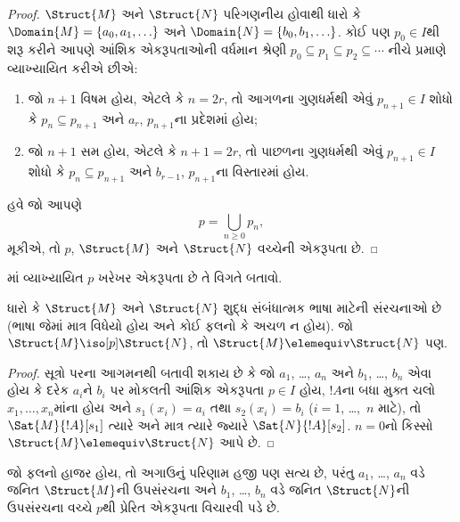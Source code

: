 \begin{proof}
  $\Struct{M}$ અને $\Struct{N}$ પરિગણનીય હોવાથી ધારો કે
  $\Domain{M} = \{a_0, a_1, \ldots \}$ અને $\Domain{N} =
  \{b_0, b_1, \ldots \}$. કોઈ પણ $p_0 \in I$થી શરૂ કરીને આપણે આંશિક
  એકરૂપતાઓની વર્ધમાન શ્રેણી $p_0 \subseteq p_1 \subseteq p_2
  \subseteq \cdots$ નીચે પ્રમાણે વ્યાખ્યાયિત કરીએ છીએ:
  \begin{enumerate}
  \item જો $n+1$ વિષમ હોય, એટલે કે $n = 2r$, તો આગળના ગુણધર્મથી એવું
    $p_{n+1} \in I$ શોધો કે $p_n \subseteq p_{n+1}$ અને $a_r$,
    $p_{n+1}$ના પ્રદેશમાં હોય;
  \item જો $n+1$ સમ હોય, એટલે કે $n+1 =2r$, તો પાછળના ગુણધર્મથી એવું
    $p_{n+1} \in I$ શોધો કે $p_n \subseteq p_{n+1}$ અને $b_{r-1}$,
    $p_{n+1}$ના વિસ્તારમાં હોય.
  \end{enumerate}
હવે જો આપણે
\[
p = \bigcup_{n\ge 0} p_n,
\]
મૂકીએ, તો $p$, $\Struct{M}$ અને $\Struct{N}$ વચ્ચેની એકરૂપતા છે.
\end{proof}

\begin{prob}
  માં વ્યાખ્યાયિત $p$ ખરેખર એકરૂપતા
  છે તે વિગતે બતાવો.
\end{prob}

\begin{thm}
  ધારો કે $\Struct{M}$ અને $\Struct{N}$ શુદ્ધ સંબંધાત્મક
  ભાષા માટેની સંરચનાઓ છે (ભાષા જેમાં માત્ર
  વિધેયો હોય અને કોઈ ફલનો કે અચળ ન હોય). જો
  $\Struct{M} \iso[p] \Struct{N}$, તો $\Struct{M} \elemequiv
  \Struct{N}$ પણ.
\end{thm}

\begin{proof}
  સૂત્રો પરના આગમનથી બતાવી શકાય છે કે જો $a_1$, \dots, $a_n$ અને
  $b_1$, \dots, $b_n$ એવા હોય કે દરેક $a_i$ને $b_i$ પર મોકલતી આંશિક
  એકરૂપતા $p\in I$ હોય, $!A$ના બધા મુક્ત ચલો $x_1,\dots,x_n$માંના હોય
  અને $s_1(x_i) =a_i$ તથા $s_2(x_i) =b_i$
  ($i =1$, \dots,~$n$ માટે), તો $\Sat{M}{!A}[s_1]$ ત્યારે અને માત્ર
  ત્યારે જ્યારે $\Sat{N}{!A}[s_2]$. $n=0$નો કિસ્સો
  $\Struct{M} \elemequiv \Struct{N}$ આપે છે.
\end{proof}

\begin{rem}
જો ફલનો હાજર હોય, તો અગાઉનું પરિણામ હજી પણ સત્ય છે, પરંતુ
$a_1$, \dots, $a_n$ વડે જનિત $\Struct{M}$ની ઉપસંરચના અને
$b_1$, \dots, $b_n$ વડે જનિત $\Struct{N}$ની ઉપસંરચના વચ્ચે
$p$થી પ્રેરિત એકરૂપતા વિચારવી પડે છે.
\end{rem}

